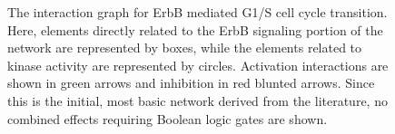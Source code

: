 \begin{figure}
{\begin{tikzpicture}[thick]
\end{tikzpicture}
}
\caption{The interaction graph for ErbB mediated G1/S cell cycle transition. Here, elements directly related to the ErbB signaling portion of the network are represented by boxes, while the elements related to kinase activity are represented by circles. Activation interactions are shown in green arrows and inhibition in red blunted arrows. Since this is the initial, most basic network derived from the literature, no combined effects requiring Boolean logic gates are shown. }
\label{network}
\end{figure}